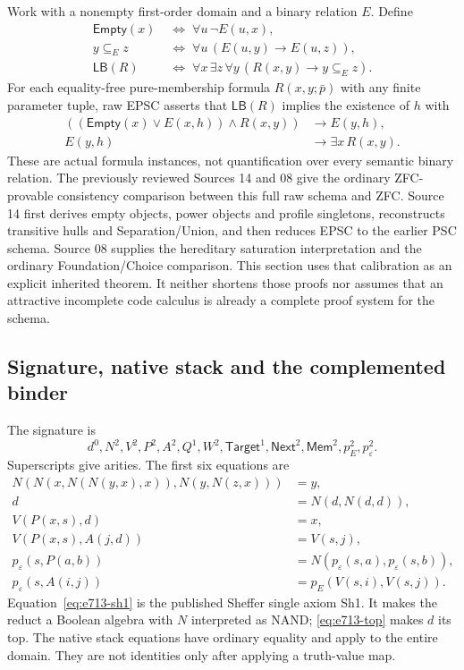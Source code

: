 Work with a nonempty first-order domain and a binary relation $E$. Define
\begin{align*}
 \mathsf{Empty}(x)&\;\Longleftrightarrow\;\forall u\,\neg E(u,x),\\
 y\subseteq_E z&\;\Longleftrightarrow\;\forall u\,(E(u,y)\to E(u,z)),\\
 \mathsf{LB}(R)&\;\Longleftrightarrow\;
       \forall x\,\exists z\,\forall y\,(R(x,y)\to y\subseteq_E z).
\end{align*}
For each equality-free pure-membership formula $R(x,y;\bar p)$ with any
finite parameter tuple, raw EPSC asserts that $\mathsf{LB}(R)$ implies
the existence of $h$ with
\begin{align}
 ((\mathsf{Empty}(x)\lor E(x,h))\land R(x,y))&\longrightarrow E(y,h),
 \label{eq:e713-close}\\
 E(y,h)&\longrightarrow\exists x\,R(x,y).
 \label{eq:e713-support}
\end{align}
These are actual formula instances, not quantification over every semantic
binary relation. The previously reviewed Sources 14 and 08 give the
ordinary ZFC-provable consistency comparison between this full raw schema
and ZFC. Source 14 first derives empty objects, power objects and profile
singletons, reconstructs transitive hulls and Separation/Union, and then
reduces EPSC to the earlier PSC schema. Source 08 supplies the hereditary
saturation interpretation and the ordinary Foundation/Choice comparison.
This section uses that calibration as an explicit inherited theorem.
It neither shortens those proofs nor assumes that an attractive incomplete
code calculus is already a complete proof system for the schema.

\subsection{Signature, native stack and the complemented binder}

The signature is
\[
 d^0,N^2,V^2,P^2,A^2,Q^1,W^2,
 \mathsf{Target}^1,\mathsf{Next}^2,\mathsf{Mem}^2,
 p_E^2,p_\varepsilon^2.
\]
Superscripts give arities. The first six equations are
\begin{align}
 N(N(x,N(N(y,x),x)),N(y,N(z,x)))&=y,\label{eq:e713-sh1}\\
 d&=N(d,N(d,d)),\label{eq:e713-top}\\
 V(P(x,s),d)&=x,\label{eq:e713-head}\\
 V(P(x,s),A(j,d))&=V(s,j),\label{eq:e713-tail}\\
 p_\varepsilon(s,P(a,b))&=N(p_\varepsilon(s,a),p_\varepsilon(s,b)),
 \label{eq:e713-nand}\\
 p_\varepsilon(s,A(i,j))&=p_E(V(s,i),V(s,j)).\label{eq:e713-atom}
\end{align}
Equation~\eqref{eq:e713-sh1} is the published Sheffer single axiom Sh1.
It makes the reduct a Boolean algebra with $N$ interpreted as NAND;
\eqref{eq:e713-top} makes $d$ its top. The native stack equations have
ordinary equality and apply to the entire domain. They are not identities
only after applying a truth-value map.

